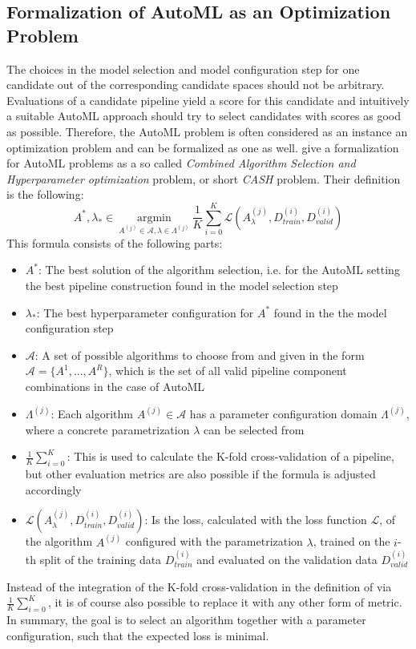 \subsection{Formalization of AutoML as an Optimization Problem}
\label{sec:theory:automl:optimization}
The choices in the model selection and model configuration step for one candidate out of the corresponding candidate spaces should not be arbitrary.
Evaluations of a candidate pipeline yield a score for this candidate and intuitively a suitable AutoML approach should try to select candidates with scores as good as possible.
Therefore, the AutoML problem is often considered as an instance an optimization problem and can be formalized as one as well.\newline
\textcite{Thornton-AutoWeka} give a formalization for AutoML problems as a so called \textit{Combined Algorithm Selection and Hyperparameter optimization} problem, or short \textit{CASH} problem.
Their definition is the following:
\begin{equation*}
    A^*, \lambda_* \in \> \underset{A^{(j)} \in \mathcal{A},\lambda \in \Lambda^{(j)}}{\mathrm{argmin}} \> \frac{1}{K} \sum_{i=0}^K \mathcal{L} (A_\lambda^{(j)}, D_{\textit{train}}^{(i)}, D_{\textit{valid}}^{(i)})
\end{equation*}
This formula consists of the following parts:
\begin{itemize}
    \item $A^*$: The best solution of the algorithm selection, i.e. for the AutoML setting the best pipeline construction found in the model selection step
    \item $\lambda_*$: The best hyperparameter configuration for $A^*$ found in the the model configuration step
    \item $\mathcal{A}$: A set of possible algorithms to choose from and given in the form $\mathcal{A} = \{A^{1}, ..., A^{R} \}$, which is the set of all valid pipeline component combinations in the case of AutoML
    \item $\Lambda^{(j)}$: Each algorithm $A^{(j)} \in \mathcal{A}$ has a parameter configuration domain $\Lambda^{(j)}$, where a concrete parametrization $\lambda$ can be selected from
    \item $\frac{1}{K} \sum_{i=0}^K$: This is used to calculate the K-fold cross-validation of a pipeline, but other evaluation metrics are also possible if the formula is adjusted accordingly
    \item $\mathcal{L} (A_\lambda^{(j)}, D_{\textit{train}}^{(i)}, D_{\textit{valid}}^{(i)})$: Is the loss, calculated with the loss function $\mathcal{L}$, of the algorithm $A^{(j)}$ configured with the parametrization $\lambda$, trained on the $i$-th split of the training data $D_{\textit{train}}^{(i)}$ and evaluated on the validation data $D_{\textit{valid}}^{(i)}$
\end{itemize}
Instead of the integration of the K-fold cross-validation in the definition of \citeauthor{Thornton-AutoWeka} via $\frac{1}{K} \sum_{i=0}^K$, it is of course also possible to replace it with any other form of metric.\newline
In summary, the goal is to select an algorithm together with a parameter configuration, such that the expected loss is minimal.

